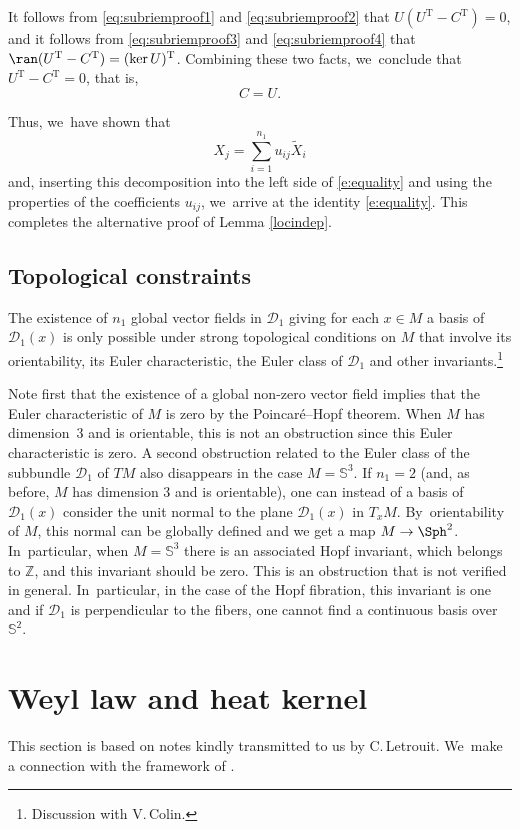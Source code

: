 It follows from \eqref{eq:subriemproof1} and \eqref{eq:subriemproof2} that $U(U^\mathrm{T} - C^\mathrm{T}) = 0$, and it follows from \eqref{eq:subriemproof3} and \eqref{eq:subriemproof4} that $\ran(U^\mathrm{T} - C^\mathrm{T}) = (\ker U)^\mathrm{T}$. Combining these two facts, we~conclude that $U^\mathrm{T} - C^\mathrm{T}=0$, that is,
\[
C = U.
\]

Thus, we~have shown that
\[
X_j = \sum_{i=1}^{n_1} u_{ij} \tilde X_i
\]
and, inserting this decomposition into the left side of \eqref{e:equality} and using the properties of the coefficients $u_{ij}$, we~arrive at the identity \eqref{e:equality}. This completes the alternative proof of Lemma \ref{locindep}.

\subsection{Topological constraints}\label{ssA.4}
The existence of $n_1$ global vector fields in $\mathcal D_1$ giving for each
$x\in M$ a basis of $\mathcal D_1(x)$ is only possible under strong topological conditions on $M$ that involve its orientability, its Euler characteristic, the Euler class of $\mathcal D_1$ and other invariants.\footnote{Discussion with V.\,Colin.}

Note first that the existence of a global non-zero vector field implies that the Euler characteristic of $M$ is zero by the Poincaré--Hopf theorem.
When $M$ has dimension~3 and is orientable, this is not an obstruction since this Euler characteristic is zero. A second obstruction related to the Euler class of the subbundle $\mathcal D_1$ of $TM$ also disappears in the case $M=\mathbb S^3$. If $n_1=2$ (and, as before, $M$ has dimension 3 and is orientable), one can instead of a basis of $\mathcal D_1(x)$ consider the unit normal to the plane $\mathcal D_1(x)$ in $T_x M$. By~orientability of $M$, this normal can be globally defined and we get a map $M \to \Sph^2$. In~particular, when $M=\mathbb S^3$ there is an associated Hopf invariant, which belongs to $\mathbb Z$, and this invariant should be zero. This is an obstruction that is not verified in general. In~particular, in the case of the Hopf fibration, this invariant is one and if $\mathcal D_1$ is perpendicular to the fibers, one cannot find a continuous basis over~$\mathbb S^2$.

\section{Weyl law and heat kernel}\label{AppC}
This section is based on notes kindly transmitted to us by C.\,Letrouit. We~make a connection with the framework of \cite{CHT1}.


